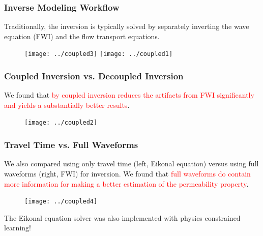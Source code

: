 \documentclass[usenames,dvipsnames]{beamer}
\begin{document}
\begin{frame}
	\frametitle{Inverse Modeling Workflow}
	Traditionally, the inversion is typically solved by separately inverting the wave equation (FWI) and the flow transport equations. 
	\begin{figure}
		\centering
			\texttt{[image: ../coupled3]}
		\texttt{[image: ../coupled1]}
	\end{figure}
\end{frame}


\begin{frame}
	\frametitle{Coupled Inversion vs. Decoupled Inversion}
	We found that \textcolor{red}{by coupled inversion reduces the artifacts from FWI significantly and yields a substantially better results}. 
	\begin{figure}
		\centering
		\texttt{[image: ../coupled2]}
	\end{figure}
\end{frame}

\begin{frame}
	\frametitle{Travel Time vs. Full Waveforms}
	We also compared using only travel time (left, Eikonal equation) versus using full waveforms (right, FWI) for inversion. We found that \textcolor{red}{full waveforms do contain more information for making a better estimation of the permeability property}. 
		\begin{figure}
		\centering
		\texttt{[image: ../coupled4]}
	\end{figure}

{\small The Eikonal equation solver was also implemented with physics constrained learning!}
\end{frame}
\end{document}
